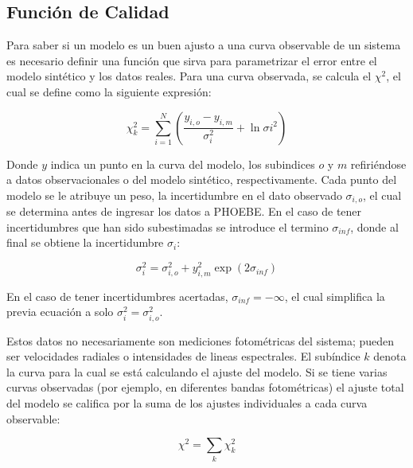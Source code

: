 \subsection{Función de Calidad}

Para saber si un modelo es un buen ajusto a una curva observable de un sistema
es necesario definir una función que sirva para parametrizar el error entre el
modelo sintético y los datos reales. Para una curva observada, se calcula el
$\chi^2$, el cual se define como la siguiente expresión:

\begin{eqfloat}[!ht]
	\centering
	\begin{equation}
		\chi_{k}^2 = \sum_{i=1}^{N}{\left(\frac{y_{i,o} - y_{i,m}}{\sigma_{i}^2} + \ln{\sigma{i}^2}\right)}
	\end{equation}
	\blankcaption
	\label{ecuacionPhoebeChi2Curva}
\end{eqfloat}

Donde $y$ indica un punto en la curva del modelo, los subindices $o$ y $m$
refiriéndose a datos observacionales o del modelo sintético, respectivamente.
Cada punto del modelo se le atribuye un peso, la incertidumbre en el dato
observado $\sigma_{i,o}$, el cual se determina antes de ingresar los datos a
PHOEBE. En el caso de tener incertidumbres que han sido subestimadas se
introduce el termino $\sigma_{inf}$, donde al final se obtiene la incertidumbre
$\sigma_{i}$:

\begin{eqfloat}[!ht]
	\centering
	\begin{equation}
		\sigma_{i}^{2} = \sigma_{i,o}^{2} + y_{i,m}^{2} \exp{\left(2 \sigma_{inf}\right)}
	\end{equation}
\end{eqfloat}

En el caso de tener incertidumbres acertadas, $\sigma_{inf} = -\infty$, el cual
simplifica la previa ecuación a solo $\sigma_{i}^{2} = \sigma_{i,o}^{2}$.

Estos datos no necesariamente son mediciones fotométricas del sistema; pueden
ser velocidades radiales o intensidades de lineas espectrales. El subíndice $k$
denota la curva para la cual se está calculando el ajuste del modelo. Si se
tiene varias curvas observadas (por ejemplo, en diferentes bandas fotométricas)
el ajuste total del modelo se califica por la suma de los ajustes individuales a
cada curva observable:

\begin{eqfloat}[!ht]
	\centering
	\begin{equation}
		\chi^2 = \sum_{k}{\chi_{k}^{2}}
	\end{equation}
	\blankcaption
	\vspace{-0.4em}
	\label{ecuacionChi2}
\end{eqfloat}

